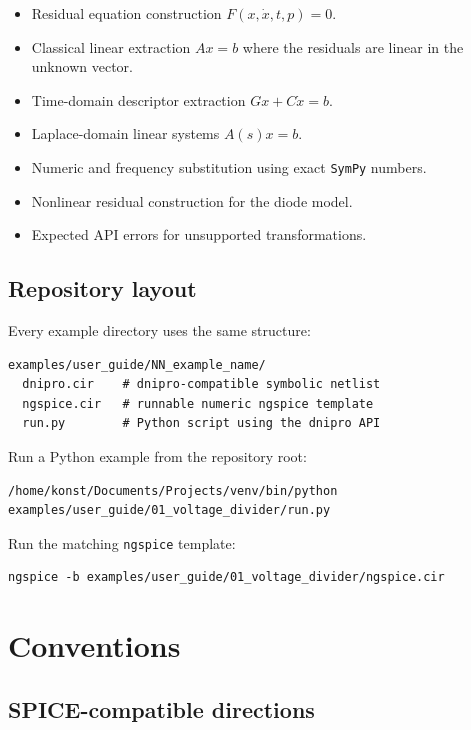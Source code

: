 \documentclass[11pt,a4paper]{article}
\newcommand{\sympy}{\texttt{SymPy}}
\newcommand{\ngspice}{\texttt{ngspice}}
\begin{document}
\begin{itemize}[noitemsep]
    \item Residual equation construction \(F(x,\dot{x},t,p)=0\).
    \item Classical linear extraction \(A x = b\) where the residuals are linear
          in the unknown vector.
    \item Time-domain descriptor extraction \(Gx + C\dot{x} = b\).
    \item Laplace-domain linear systems \(A(s)x=b\).
    \item Numeric and frequency substitution using exact \sympy{} numbers.
    \item Nonlinear residual construction for the diode model.
    \item Expected API errors for unsupported transformations.
\end{itemize}

\subsection{Repository layout}

Every example directory uses the same structure:

\begin{lstlisting}[style=textout]
examples/user_guide/NN_example_name/
  dnipro.cir    # dnipro-compatible symbolic netlist
  ngspice.cir   # runnable numeric ngspice template
  run.py        # Python script using the dnipro API
\end{lstlisting}

Run a Python example from the repository root:

\begin{lstlisting}[style=shell]
/home/konst/Documents/Projects/venv/bin/python examples/user_guide/01_voltage_divider/run.py
\end{lstlisting}

Run the matching \ngspice{} template:

\begin{lstlisting}[style=shell]
ngspice -b examples/user_guide/01_voltage_divider/ngspice.cir
\end{lstlisting}

\section{Conventions}

\subsection{SPICE-compatible directions}
\end{document}
